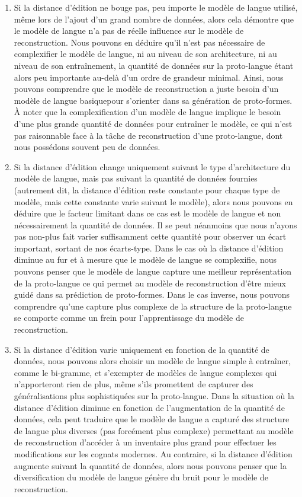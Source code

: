 \documentclass[10pt, french]{article}
\begin{document}
\begin{multicols*}{2}
\begin{enumerate}
    \item Si la distance d'édition ne bouge pas, peu importe le modèle de langue utilisé, même lors de l'ajout d'un grand nombre de données, alors cela démontre que le modèle de langue n'a pas de réelle influence sur le modèle de reconstruction. Nous pouvons en déduire qu'il n'est pas nécessaire de complexifier le modèle de langue, ni au niveau de son architecture, ni au niveau de son entraînement, la quantité de données sur la proto-langue étant alors peu importante au-delà d'un ordre de grandeur minimal. Ainsi, nous pouvons comprendre que le modèle de reconstruction a juste besoin d'un modèle de langue \og basique\fg pour s'orienter dans sa génération de proto-formes. À noter que la complexification d'un modèle de langue implique le besoin d'une plus grande quantité de données pour entraîner le modèle, ce qui n'est pas raisonnable face à la tâche de reconstruction d'une proto-langue, dont nous possédons souvent peu de données.
    \item Si la distance d'édition change uniquement suivant le type d'architecture du modèle de langue, mais pas suivant la quantité de données fournies (autrement dit, la distance d'édition reste constante pour chaque type de modèle, mais cette constante varie suivant le modèle), alors nous pouvons en déduire que le facteur limitant dans ce cas est le modèle de langue et non nécessairement la quantité de données. Il se peut néanmoins que nous n'ayons pas non-plus fait varier suffisamment cette quantité pour observer un écart important, sortant de nos écarts-type. Dans le cas où la distance d'édition diminue au fur et à mesure que le modèle de langue se complexifie, nous pouvons penser que le modèle de langue capture une meilleur représentation de la proto-langue ce qui permet au modèle de reconstruction d'être mieux guidé dans sa prédiction de proto-formes. Dans le cas inverse, nous pouvons comprendre qu'une capture plus complexe de la structure de la proto-langue se comporte comme un frein pour l'apprentissage du modèle de reconstruction.
    \item Si la distance d'édition varie uniquement en fonction de la quantité de données, nous pouvons alors choisir un modèle de langue simple à entraîner, comme le bi-gramme, et s'exempter de modèles de langue complexes qui n'apporteront rien de plus, même s'ils promettent de capturer des généralisations plus sophistiquées sur la proto-langue. Dans la situation où la distance d'édition diminue en fonction de l'augmentation de la quantité de données, cela peut traduire que le modèle de langue a capturé des structure de langue plus diverses (pas forcément plus complexe) permettant au modèle de reconstruction d'accéder à un inventaire plus grand pour effectuer les modifications sur les cognats modernes. Au contraire, si la distance d'édition augmente suivant la quantité de données, alors nous pouvons penser que la diversification du modèle de langue génère du bruit pour le modèle de reconstruction. 

\end{enumerate}
\end{multicols*}
\end{document}
